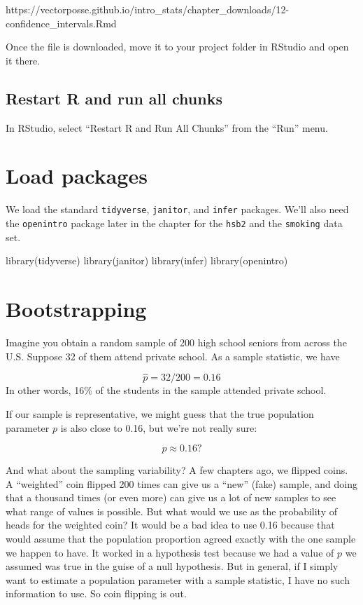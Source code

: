 \documentclass[
]{book}
\newenvironment{Shaded}{\begin{snugshade}}{\end{snugshade}}
\newcommand{\FunctionTok}[1]{\textcolor[rgb]{0.00,0.00,0.00}{#1}}
\newcommand{\NormalTok}[1]{#1}
\begin{document}
https://vectorposse.github.io/intro\_stats/chapter\_downloads/12-confidence\_intervals.Rmd

Once the file is downloaded, move it to your project folder in RStudio and open it there.

\hypertarget{ci-restart}{%
\subsection{Restart R and run all chunks}\label{ci-restart}}

In RStudio, select ``Restart R and Run All Chunks'' from the ``Run'' menu.

\hypertarget{ci-load}{%
\section{Load packages}\label{ci-load}}

We load the standard \texttt{tidyverse}, \texttt{janitor}, and \texttt{infer} packages. We'll also need the \texttt{openintro} package later in the chapter for the \texttt{hsb2} and the \texttt{smoking} data set.

\begin{Shaded}
\begin{Highlighting}[]
\FunctionTok{library}\NormalTok{(tidyverse)}
\FunctionTok{library}\NormalTok{(janitor)}
\FunctionTok{library}\NormalTok{(infer)}
\FunctionTok{library}\NormalTok{(openintro)}
\end{Highlighting}
\end{Shaded}

\hypertarget{ci-boot}{%
\section{Bootstrapping}\label{ci-boot}}

Imagine you obtain a random sample of 200 high school seniors from across the U.S. Suppose 32 of them attend private school. As a sample statistic, we have

\[
\hat{p} = 32/200 = 0.16
\]
In other words, 16\% of the students in the sample attended private school.

If our sample is representative, we might guess that the true population parameter \(p\) is also close to 0.16, but we're not really sure:

\[
p \approx 0.16?
\]

And what about the sampling variability? A few chapters ago, we flipped coins. A ``weighted'' coin flipped 200 times can give us a ``new'' (fake) sample, and doing that a thousand times (or even more) can give us a lot of new samples to see what range of values is possible. But what would we use as the probability of heads for the weighted coin? It would be a bad idea to use 0.16 because that would assume that the population proportion agreed exactly with the one sample we happen to have. It worked in a hypothesis test because we had a value of \(p\) we assumed was true in the guise of a null hypothesis. But in general, if I simply want to estimate a population parameter with a sample statistic, I have no such information to use. So coin flipping is out.
\end{document}
